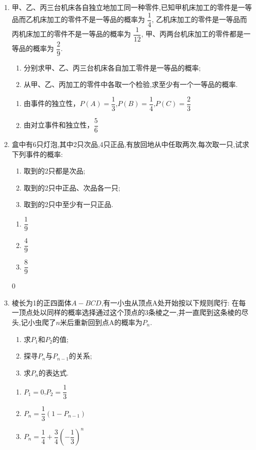 \begin{enumerate}
\item 甲、乙、丙三台机床各自独立地加工同一种零件,已知甲机床加工的零件是一等品而乙机床加工的零件不是一等品的概率为 $\dfrac{1}{4}$, 乙机床加工的零件是一等品而丙机床加工的零件不是一等品的概率为 $\dfrac{1}{12}$, 甲、丙两台机床加工的零件都是一等品的概率为 $\dfrac{2}{9}$.
\begin{enumerate}
\item 分别求甲、乙、丙三台机床各自加工零件是一等品的概率;
\item 从甲、乙、丙加工的零件中各取一个检验,求至少有一个一等品的概率.
\end{enumerate}
\begin{jieda}
    \begin{enumerate}
        \item 由事件的独立性，$P(A)=\dfrac{1}{3}$,$P(B)=\dfrac{1}{4}$,$P(C)=\dfrac{2}{3}$
        \item 由对立事件和独立性，$\dfrac{5}{6}$
    \end{enumerate}
\end{jieda}




\item 盒中有6只灯泡,其中2只次品,4只正品,有放回地从中任取两次,每次取一只,试求下列事件的概率:
\begin{enumerate}
\item 取到的2只都是次品;
\item 取到的2只中正品、次品各一只;
\item 取到的2只中至少有一只正品.
\end{enumerate}
\begin{jieda}
    \begin{enumerate}
        \item $\dfrac{1}{9}$
        \item $\dfrac{4}{9}$
        \item $\dfrac{8}{9}$
    \end{enumerate}
\end{jieda}


0\item 棱长为1的正四面体$A-BCD$,有一小虫从顶点A处开始按以下规则爬行: 在每一顶点处以同样的概率选择通过这个顶点的3条棱之一,并一直爬到这条棱的尽头,记小虫爬了$n$米后重新回到点A的概率为$P_n$.
\begin{enumerate}
    \item 求$P_1$和$P_2$的值;
    \item 探寻$P_n$与$P_{n-1}$的关系;
    \item 求$P_n$的表达式.
\end{enumerate}

\begin{jieda}
    \begin{enumerate}
        \item $P_1=0$,$P_2=\dfrac{1}{3}$
        \item $P_n=\dfrac{1}{3}(1-P_{n-1})$
        \item $P_{n}=\dfrac{1}{4}+\dfrac{3}{4}(-\dfrac{1}{3})^n$
    \end{enumerate}
\end{jieda}

\end{enumerate}

